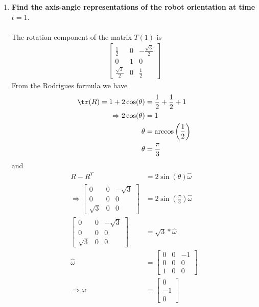 \documentclass{article}
\begin{document}
\begin{enumerate}
    \begin{enumerate}
      \item \textbf{Find the axis-angle representations of the robot orientation at time $t=1$}. \\\\
      The rotation component of the matrix $T(1)$ is 
      \begin{align*}
      \begin{bmatrix}
       \frac{1}{2}  & 0 & -\frac{\sqrt{3}}{2} \\
    0  &  1 &  0\\
    \frac{\sqrt{3}}{2} &  0 & \frac{1}{2} 
      \end{bmatrix}
      \end{align*}
      From the Rodrigues formula we have
      \begin{align*}
       \tr(R) = 1 + 2 \cos(\theta) &= \frac{1}{2} + \frac{1}{2} + 1
       \\
       \Rightarrow 2 \cos(\theta) &= 1
       \\
       \theta &= \arccos\left(\frac{1}{2}\right)
       \\
       \theta &= \frac{\pi}{3}
      \end{align*}
      and
      \begin{align*}
       R-R^T &= 2\sin(\theta) \hat \omega
       \\
       \Rightarrow \begin{bmatrix}
                0 & 0 & -\sqrt{3} \\
                0 & 0& 0 \\
                \sqrt{3} & 0 & 0
               \end{bmatrix} &=  2 \sin\left(\frac{\pi}{3}\right) \hat \omega
      \\
      \begin{bmatrix}
                0 & 0 & -\sqrt{3} \\
                0 & 0& 0 \\
                \sqrt{3} & 0 & 0
               \end{bmatrix} &=  \sqrt{3} * \hat \omega
               \\
               \hat \omega &= \begin{bmatrix}
                0 & 0 & -1 \\
                0 & 0& 0 \\
                1 & 0 & 0
               \end{bmatrix}
               \\
               \Rightarrow \omega &= \begin{bmatrix}
                                      0 \\ -1 \\ 0
                                     \end{bmatrix}
      \end{align*}




\end{enumerate}
\end{enumerate}
\end{document}
